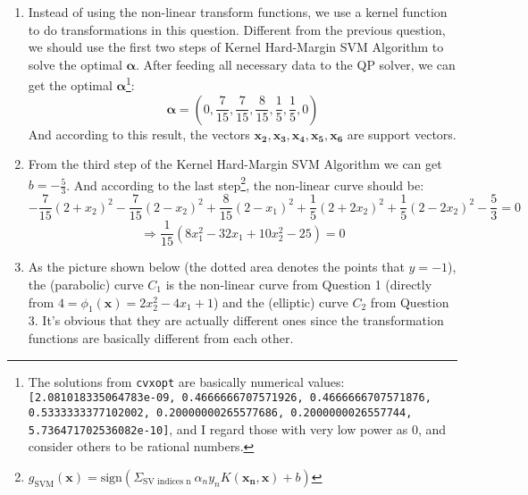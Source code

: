 \documentclass[11pt]{article}
\begin{document}
\begin{enumerate}[label=\textbf{\arabic*}.]
	\item Instead of using the non-linear transform functions, we use a kernel function to do transformations in this question. Different from the previous question, we should use the first two steps of Kernel Hard-Margin SVM Algorithm to solve the optimal $\bm{\alpha}$. After feeding all necessary data to the QP solver, we can get the optimal $\bm{\alpha}$\footnote{The solutions from \texttt{cvxopt} are basically numerical values: \texttt{[2.081018335064783e-09, 0.4666666707571926, 0.4666666707571876, 0.5333333377102002, 0.20000000265577686, 0.2000000026557744, 5.736471702536082e-10]}, and I regard those with very low power as 0, and consider others to be rational numbers. }: \[\bm{\alpha} = (0, \frac{7}{15}, \frac{7}{15}, \frac{8}{15}, \frac{1}{5}, \frac{1}{5}, 0)\]
	And according to this result, the vectors $\mathbf{x_2}, \mathbf{x_3}, \mathbf{x_4}, \mathbf{x_5}, \mathbf{x_6}$ are support vectors.
	
	\item From the third step of the Kernel Hard-Margin SVM Algorithm we can get $b = -\frac{5}{3}$. And according to the last step\footnote{$g_{\mathrm{SVM}}(\mathbf{x})=\text{sign}\left( \Sigma_{\text{SV indices n}}\ \alpha_n y_n K(\mathbf{x_n}, \mathbf{x}) + b \right)$}, the non-linear curve should be: \[-\frac{7}{15}(2+x_2)^2-\frac{7}{15}(2-x_2)^2+\frac{8}{15}(2-x_1)^2+\frac{1}{5}(2+2x_2)^2+\frac{1}{5}(2-2x_2)^2-\frac{5}{3}=0\]
	\[ \Rightarrow\frac{1}{15}(8x_1^2-32x_1+10x_2^2-25)=0\]
	
	\item As the picture shown below (the dotted area denotes the points that $y = -1$), the (parabolic) curve $C_1$ is the non-linear curve from Question 1 (directly from $4 = \phi_1(\mathbf{x})=2x_2^2-4x_1+1$) and the (elliptic) curve  $C_2$ from Question 3. It's obvious that they are actually different ones since the transformation functions are basically different from each other.
	

\end{enumerate}
\end{document}
